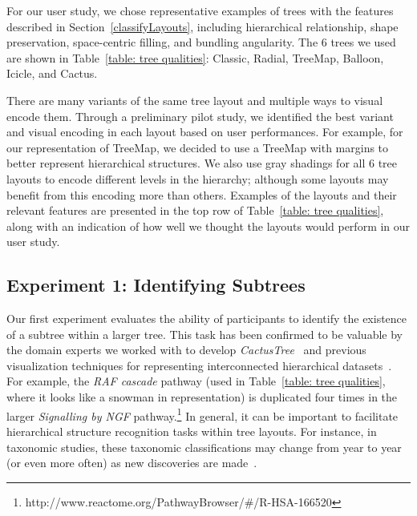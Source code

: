 \documentclass[a4paper]{llncs}
\begin{document}

For our user study, we chose representative examples of trees with the features described in Section~\ref{classifyLayouts}, including hierarchical relationship, shape preservation, space-centric filling, and bundling angularity. The 6 trees we used are shown in Table~\ref{table: tree qualities}: Classic, Radial, TreeMap, Balloon, Icicle, and Cactus. 

There are many variants of the same tree layout and multiple ways to visual encode them. Through a preliminary pilot study, we identified the best variant and visual encoding in each layout based on user performances. For example, for our representation of TreeMap, we decided to use a TreeMap with margins to better represent hierarchical structures. We also use gray shadings for all 6 tree layouts to encode different levels in the hierarchy; although some layouts may benefit from this encoding more than others. Examples of the layouts and their relevant features are presented in the top row of Table~\ref{table: tree qualities}, along with an indication of how well we thought the layouts would perform in our user study.

\subsection{Experiment 1: Identifying Subtrees}

 Our first experiment evaluates the ability of participants to identify the existence of a subtree within a larger tree. This task has been confirmed to be valuable by the domain experts we worked with to develop \textit{CactusTree}~\cite{Dang2017CactusTrees} and previous visualization techniques for representing interconnected hierarchical datasets~\cite{Dang2016_EuroVA,dang2015provenancematrix,Dang2015ReactionFlow,Dang2017_BioLinker_IEEEPacificVis,Dang2016a_IEEEEuroVis,biovisDang1}. For example, the \textit{RAF cascade} pathway (used in Table~\ref{table: tree qualities}, where it looks like a snowman in \theName{} representation) is duplicated four times in the larger \textit{Signalling by NGF} pathway.\footnote{http://www.reactome.org/PathwayBrowser/\#/R-HSA-166520} %
In general, it can be important to facilitate hierarchical structure recognition tasks within tree layouts. For instance, in taxonomic studies, these taxonomic classifications may change from year to year (or even more often) as new discoveries are made~\cite{Hinchliff2015phylogeny}.
\end{document}
